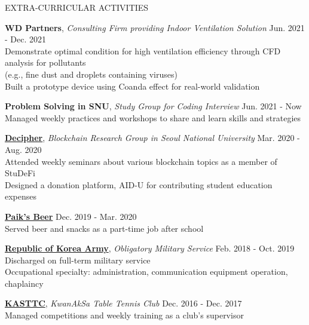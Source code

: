 \documentclass[12pt]{resume} %
\begin{document}
\begin{rSection}{EXTRA-CURRICULAR ACTIVITIES}
%

{\bf WD Partners}, \textit{Consulting Firm providing Indoor Ventilation Solution} \hfill Jun. 2021 - Dec. 2021\\
Demonstrate optimal condition for high ventilation efficiency through CFD analysis for pollutants \\
(e.g., fine dust and droplets containing viruses) \\
Built a prototype device using Coanda effect for real-world validation 

{\bf Problem Solving in SNU}, \textit{Study Group for Coding Interview} \hfill Jun. 2021 - Now \\
Managed weekly practices and workshops to share and learn skills and strategies

{\bf \href{https://decipher.ac/}{Decipher}}, \textit{Blockchain Research Group in Seoul National University} \hfill Mar. 2020 - Aug. 2020\\
Attended weekly seminars about various blockchain topics as a member of StuDeFi \\
Designed a donation platform, AID-U for contributing student education expenses 

{\bf \href{http://paiksbeer.com/}{Paik’s Beer}} \hfill Dec. 2019 - Mar. 2020\\
Served beer and snacks as a part-time job after school \

{\bf \href{https://www.army.mil.kr/}{Republic of Korea Army}}, \textit{Obligatory Military Service} \hfill Feb. 2018 - Oct. 2019 \\
Discharged on full-term military service \\
Occupational specialty: administration, communication equipment operation, chaplaincy 

{\bf \href{http://kasttc.kr/}{KASTTC}}, \textit{KwanAkSa Table Tennis Club} \hfill Dec. 2016 - Dec. 2017\\
Managed competitions and weekly training as a club's supervisor

\end{rSection}
\end{document}
